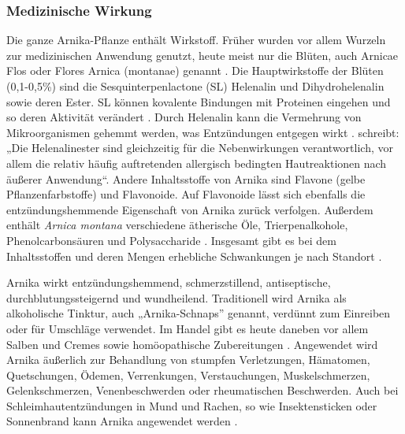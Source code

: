 \subsubsection{Medizinische Wirkung}

Die ganze Arnika-Pflanze enthält Wirkstoff. Früher wurden vor allem Wurzeln zur medizinischen Anwendung genutzt, heute meist nur die Blüten, auch Arnicae Flos oder Flores Arnica (montanae) genannt \citep[vgl.][S. 144 f.]{Roth2012}. Die Hauptwirkstoffe der Blüten (0,1-0,5\%) sind die Sesquinterpenlactone (SL) Helenalin und Dihydrohelenalin sowie deren Ester. SL können kovalente Bindungen mit Proteinen eingehen und so deren Aktivität verändert \citep[vgl.][S. 62]{Wyk2015}. Durch Helenalin kann die Vermehrung von Mikroorganismen gehemmt werden, was Entzündungen entgegen wirkt \citep[vgl.][S. 32 f.]{FNR2013}. \citet[S. 73 f.]{Schoenfelder2011} schreibt: „Die Helenalinester sind gleichzeitig für die Nebenwirkungen verantwortlich, vor allem die relativ häufig auftretenden allergisch bedingten Hautreaktionen nach äußerer Anwendung“. Andere Inhaltsstoffe von Arnika sind Flavone (gelbe Pflanzenfarbstoffe) und Flavonoide. Auf Flavonoide lässt sich ebenfalls die entzündungshemmende Eigenschaft von Arnika zurück verfolgen. Außerdem enthält \textit{Arnica montana} verschiedene ätherische Öle, Trierpenalkohole, Phenolcarbonsäuren und Polysaccharide \citep[vgl.][]{Wyk2015, Schoenfelder2011}. Insgesamt gibt es bei dem Inhaltsstoffen und deren Mengen erhebliche Schwankungen je nach Standort \citep[vgl.][S. 144 f.]{Roth2012}.

Arnika wirkt entzündungshemmend, schmerzstillend, antiseptische, durchblutungssteigernd und wundheilend. Traditionell wird Arnika als alkoholische Tinktur, auch „Arnika-Schnaps” genannt, verdünnt zum Einreiben oder für Umschläge verwendet. Im Handel gibt es heute daneben vor allem Salben und Cremes sowie homöopathische Zubereitungen \citep[vgl.][S. 32 f.; S. 399]{FNR2013, Prentner2017}. Angewendet wird Arnika äußerlich zur Behandlung von stumpfen Verletzungen, Hämatomen, Quetschungen, Ödemen, Verrenkungen, Verstauchungen, Muskelschmerzen, Gelenkschmerzen, Venenbeschwerden oder rheumatischen Beschwerden. Auch bei Schleimhautentzündungen in Mund und Rachen, so wie Insektensticken oder Sonnenbrand kann Arnika angewendet werden \citep[vgl.][]{Roth2012, Prentner2017, Wyk2015, FNR2013, Schoenfelder2011}.


